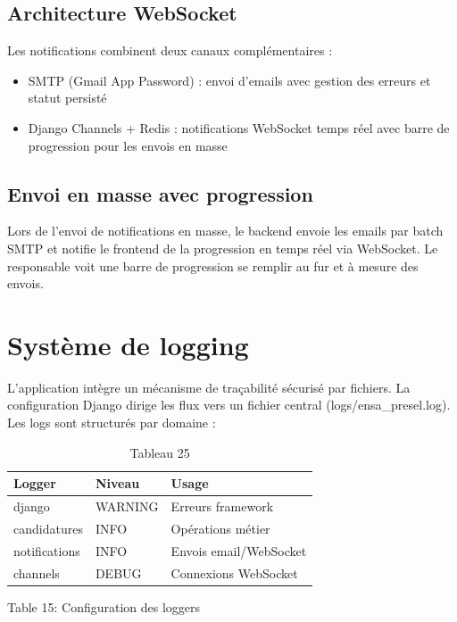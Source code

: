 \subsection{Architecture WebSocket}

Les notifications combinent deux canaux complémentaires :

\begin{itemize}
\item SMTP (Gmail App Password) : envoi d'emails avec gestion des erreurs et statut persisté
\item Django Channels + Redis : notifications WebSocket temps réel avec barre de progression pour les envois en masse
\end{itemize}

\subsection{Envoi en masse avec progression}

Lors de l'envoi de notifications en masse, le backend envoie les emails par batch SMTP et notifie le frontend de la progression en temps réel via WebSocket. Le responsable voit une barre de progression se remplir au fur et à mesure des envois.

\section{Système de logging}

L'application intègre un mécanisme de traçabilité sécurisé par fichiers. La configuration Django dirige les flux vers un fichier central (logs/ensa\_presel.log). Les logs sont structurés par domaine :

\begin{table}[htbp]
\centering
\begin{tabular}{|l|l|l|}
\hline
Logger & Niveau & Usage \\
\hline
django & WARNING & Erreurs framework \\
\hline
candidatures & INFO & Opérations métier \\
\hline
notifications & INFO & Envois email/WebSocket \\
\hline
channels & DEBUG & Connexions WebSocket \\
\hline
\end{tabular}
\caption{Tableau 25}
\label{tab:table_25}
\end{table}

Table 15: Configuration des loggers

